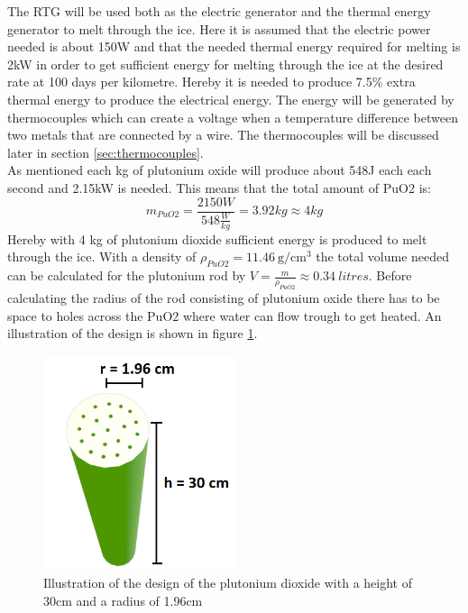 \label{sec:ThermalDesign}
The RTG will be used both as the electric generator and the thermal energy generator to melt through the ice. Here it is assumed that the electric power needed is about 150W and that the needed thermal energy required for melting is 2kW in order to get sufficient energy for melting through the ice at the desired rate at 100 days per kilometre. Hereby it is needed to produce 7.5\% extra thermal energy to produce the electrical energy. The energy will be generated by thermocouples which can create a voltage when a temperature difference between two metals that are connected by a wire. The thermocouples will be discussed later in section \ref{sec:thermocouples}. \\

\noindent
As mentioned each kg of plutonium oxide will produce about 548J each each second and 2.15kW is needed. This means that the total amount of PuO2 is: 
\begin{equation}
m_{PuO2} = \frac{2150W}{548 \frac{W}{kg}} = 3.92 kg \approx 4 kg 
\end{equation}
Hereby with 4 kg of plutonium dioxide sufficient energy is produced to melt through the ice. With a density of $\rho_{PuO2} = \SI{11.46}{\g\per\cm^3}$\cite{golovnin2001a} the total volume needed can be calculated for the plutonium rod by $V = \frac{m}{\rho_{PuO2}} \approx \SI{0.34}{litres}$. Before calculating the radius of the rod consisting of plutonium oxide there has to be space to holes across the PuO2 where water can flow trough to get heated. An illustration of the design is shown in figure \ref{fig:RTGcenter}.
\begin{figure}[htb]
  \centering
  \includegraphics[width=0.5\textwidth]{figures/Ricardo/RTG3.png}
  \caption{Illustration of the design of the plutonium dioxide with a height of 30cm and a radius of 1.96cm}
  \label{fig:RTGcenter}
\end{figure}
